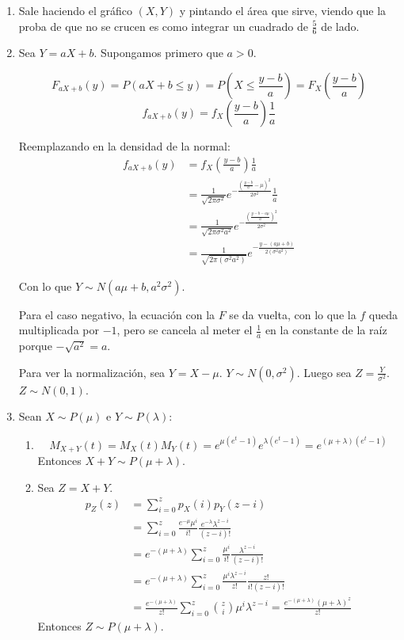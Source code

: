 \begin{enumerate}
	\item
		Sale haciendo el gráfico $(X,Y)$ y pintando el área que sirve, viendo que la proba de que no se crucen es como integrar un cuadrado de $\frac{5}{6}$ de lado.
		
	\item
		Sea $Y=aX+b$.
		Supongamos primero que $a>0$.
		
		$$F_{aX+b}(y) = P(aX+b \leq y) = P\left(X \leq \frac{y-b}{a}\right) = F_X\left(\frac{y-b}{a}\right)$$
		$$f_{aX+b}(y) = f_X\left(\frac{y-b}{a}\right)\frac{1}{a}$$
		
		Reemplazando en la densidad de la normal:
		\begin{align*}
			f_{aX+b}(y)	& = f_X\left(\frac{y-b}{a}\right)\frac{1}{a}																\\
						& = \frac{1}{\sqrt{2\pi \sigma^2}} e^{-\frac{\left(\frac{y-b}{a} - \mu\right)^2}{2\sigma^2}} \frac{1}{a}	\\
						& = \frac{1}{\sqrt{2\pi \sigma^2 a^2}} e^{-\frac{\left(\frac{y-b-a\mu}{a}\right)^2}{2\sigma^2}}				\\
						& = \frac{1}{\sqrt{2\pi (\sigma^2 a^2)}} e^{-\frac{y-(a\mu+b)}{2(\sigma^2a^2)}}
		\end{align*}
		
		Con lo que $Y \sim N(a\mu + b, a^2\sigma^2)$.
		
		Para el caso negativo, la ecuación con la $F$ se da vuelta, con lo que la $f$ queda multiplicada por $-1$,
		pero se cancela al meter el $\frac{1}{a}$ en la constante de la raíz porque $-\sqrt{a^2} = a$.
		
		Para ver la normalización, sea $Y = X - \mu$. $Y\sim N(0, \sigma^2)$. Luego sea $Z=\frac{Y}{\sigma^2}$. $Z\sim N(0,1)$.
	
	\item
		Sean $X\sim P(\mu)$ e $Y\sim P(\lambda)$:
		\begin{enumerate}
			\item
				$$M_{X+Y}(t) = M_X(t) M_Y(t) = e^{\mu(e^t-1)}e^{\lambda(e^t-1)} = e^{(\mu+\lambda)(e^t-1)}$$
				Entonces $X+Y\sim P(\mu+\lambda)$.
			\item
				Sea $Z = X+Y$.
				\begin{align*}
					p_Z(z)	& = \sum_{i=0}^z p_X(i)p_Y(z-i)	\\
							& = \sum_{i=0}^z \frac{e^{-\mu}\mu^i}{i!}\frac{e^{-\lambda}\lambda^{z-i}}{(z-i)!}	\\
							& = e^{-(\mu+\lambda)}\sum_{i=0}^z \frac{\mu^i}{i!}\frac{\lambda^{z-i}}{(z-i)!}		\\
							& = e^{-(\mu+\lambda)}\sum_{i=0}^z \frac{\mu^i\lambda^{z-i}}{z!} \frac{z!}{i!(z-i)!}		\\
							& = \frac{e^{-(\mu+\lambda)}}{z!}\sum_{i=0}^z \binom{z}{i}\mu^i\lambda^{z-i} = 	\frac{e^{-(\mu+\lambda)}(\mu+\lambda)^z}{z!}
				\end{align*}
				Entonces $Z\sim P(\mu+\lambda)$.
		\end{enumerate}
		

\end{enumerate}
